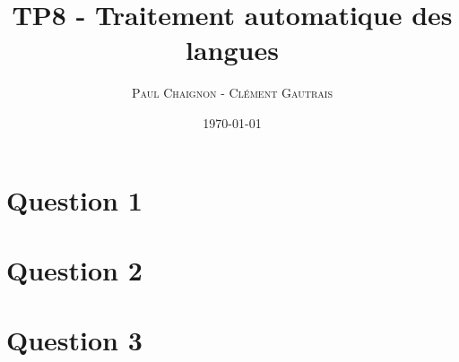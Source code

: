 \documentclass[a4paper,12pt]{article}
\title{TP8 - Traitement automatique des langues}
\author{\textsc{Paul Chaignon} - \textsc{Clément Gautrais}}
\date{\today}
\begin{document}
\maketitle

\section{Question 1}


\vspace{2cm}

\section{Question 2}


\vspace{2cm}

\section{Question 3}


\vspace{2cm}
\end{document}
